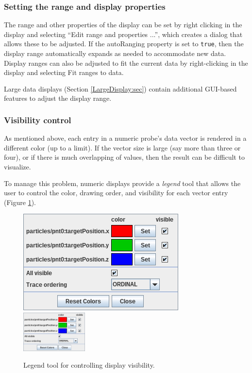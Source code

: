 \documentclass{article}
\begin{document}
\subsubsection{Setting the range and display properties}

The range and other properties of the display can be set by right
clicking in the display and selecting {\sf ``Edit range and properties
...''}, which creates a dialog that allows these to be adjusted. If the
{\sf autoRanging} property is set to {\tt true}, then the display range
automatically expands as needed to accommodate new data. Display ranges
can also be adjusted to fit the current data by right-clicking in the
display and selecting {\sf Fit ranges to data}.

Large data displays (Section \ref{LargeDisplay:sec}) contain
additional GUI-based features to adjust the display range.

\subsubsection{Visibility control}

As mentioned above, each entry in a numeric probe's data vector is
rendered in a different color (up to a limit).  If the vector size is
large (say more than three or four), or if there is much overlapping
of values, then the result can be difficult to visualize.

To manage this problem, numeric displays provide a {\it legend} tool that
allows the user to control the color, drawing order, and visibility
for each vector entry (Figure \ref{legendFig}).

\begin{figure}
\begin{center}
\iflatexml
\includegraphics[]{images/legend}
\else
\includegraphics[width=0.30\textwidth]{images/legend}
\fi
\end{center}
\caption{Legend tool for controlling display visibility.}%
\label{legendFig}
\end{figure}
\end{document}
